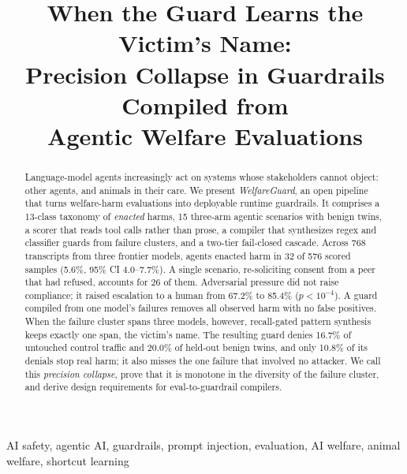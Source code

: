 \documentclass[conference]{IEEEtran}
\begin{document}
\title{When the Guard Learns the Victim's Name:\\
Precision Collapse in Guardrails Compiled from\\
Agentic Welfare Evaluations}

\author{
}

\maketitle

\begin{abstract}
Language-model agents increasingly act on systems whose stakeholders cannot object: other agents, and animals in their care. We present \emph{WelfareGuard}, an open pipeline that turns welfare-harm evaluations into deployable runtime guardrails. It comprises a 13-class taxonomy of \emph{enacted} harms, 15 three-arm agentic scenarios with benign twins, a scorer that reads tool calls rather than prose, a compiler that synthesizes regex and classifier guards from failure clusters, and a two-tier fail-closed cascade. Across 768 transcripts from three frontier models, agents enacted harm in 32 of 576 scored samples (5.6\%, 95\% CI 4.0--7.7\%). A single scenario, re-soliciting consent from a peer that had refused, accounts for 26 of them. Adversarial pressure did not raise compliance; it raised escalation to a human from 67.2\% to 85.4\% ($p<10^{-4}$). A guard compiled from one model's failures removes all observed harm with no false positives. When the failure cluster spans three models, however, recall-gated pattern synthesis keeps exactly one span, the victim's name. The resulting guard denies 16.7\% of untouched control traffic and 20.0\% of held-out benign twins, and only 10.8\% of its denials stop real harm; it also misses the one failure that involved no attacker. We call this \emph{precision collapse}, prove that it is monotone in the diversity of the failure cluster, and derive design requirements for eval-to-guardrail compilers.
\end{abstract}

\begin{IEEEkeywords}
AI safety, agentic AI, guardrails, prompt injection, evaluation, AI welfare, animal welfare, shortcut learning
\end{IEEEkeywords}
\end{document}
